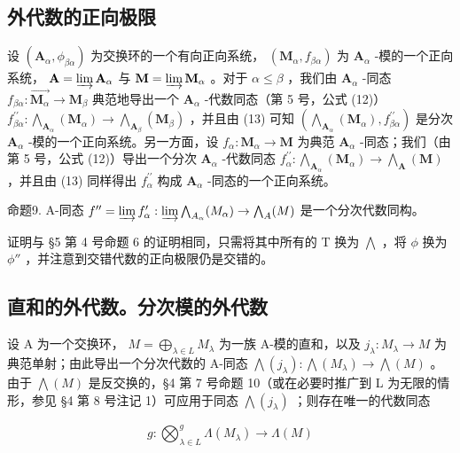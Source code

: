 \subsection{外代数的正向极限}

设 \((\mathbf{A}_{\alpha},\phi_{\beta \alpha})\) 为交换环的一个有向正向系统， \((\mathbf{M}_{\alpha},f_{\beta \alpha})\) 为 \(\mathbf{A}_{\alpha}\) -模的一个正向系统， \(\mathbf{A} = \varinjlim \mathbf{A}_{\alpha}\) 与 \(\mathbf{M} = \varinjlim \mathbf{M}_{\alpha}\) 。对于 \(\alpha \leqslant \beta\) ，我们由 \(\mathbf{A}_{\alpha}\) -同态 \(f_{\beta \alpha}: \overrightarrow{\mathbf{M}_{\alpha}} \to \mathbf{M}_{\beta}\) 典范地导出一个 \(\mathbf{A}_{\alpha}\) -代数同态（第 5 号，公式 (12)） \(f_{\beta \alpha}^{\prime \prime}: \bigwedge_{\mathbf{A}_{\alpha}} (\mathbf{M}_{\alpha}) \to \bigwedge_{\mathbf{A}_{\beta}} (\mathbf{M}_{\beta})\) ，并且由 (13) 可知 \((\bigwedge_{\mathbf{A}_{\alpha}} (\mathbf{M}_{\alpha}), f_{\beta \alpha}^{\prime \prime})\) 是分次 \(\mathbf{A}_{\alpha}\) -模的一个正向系统。另一方面，设 \(f_{\alpha}: \mathbf{M}_{\alpha} \to \mathbf{M}\) 为典范 \(\mathbf{A}_{\alpha}\) -同态；我们（由第 5 号，公式 (12)）导出一个分次 \(\mathbf{A}_{\alpha}\) -代数同态 \(f_{\alpha}^{\prime \prime}: \bigwedge_{\mathbf{A}_{\alpha}} (\mathbf{M}_{\alpha}) \to \bigwedge_{\mathbf{A}} (\mathbf{M})\) ，并且由 (13) 同样得出 \(f_{\alpha}^{\prime \prime}\) 构成 \(\mathbf{A}_{\alpha}\) -同态的一个正向系统。

命题9. A-同态 \(f'' = \varinjlim f_{\alpha}' : \varinjlim \bigwedge_{A_{\alpha}}(M_{\alpha}) \to \bigwedge_{A}(M)\) 是一个分次代数同构。

证明与 §5 第 4 号命题 6 的证明相同，只需将其中所有的 T 换为 \(\bigwedge\) ，将 \(\phi\) 换为 \(\phi''\) ，并注意到交错代数的正向极限仍是交错的。

\subsection{直和的外代数。分次模的外代数}

设 A 为一个交换环， \(M = \bigoplus_{\lambda \in L} M_{\lambda}\) 为一族 A-模的直和，以及 \(j_{\lambda}: M_{\lambda} \to M\) 为典范单射；由此导出一个分次代数的 A-同态 \(\bigwedge(j_{\lambda}): \bigwedge(M_{\lambda}) \to \bigwedge(M)\) 。由于 \(\bigwedge(M)\) 是反交换的，§4 第 7 号命题 10（或在必要时推广到 L 为无限的情形，参见 §4 第 8 号注记 1）可应用于同态 \(\bigwedge(j_{\lambda})\) ；则存在唯一的代数同态

\[
g \colon \bigotimes_ {\lambda \in L} ^ {g} \Lambda (M _ {\lambda}) \to \Lambda (M)\tag{14}
\]

